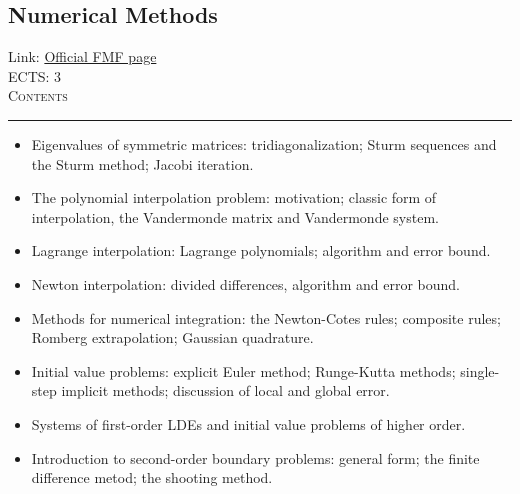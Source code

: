 \documentclass[11pt, a4paper]{article}
\newenvironment{course}[3]{
\subsection{#1}%
Link: \href{#2}{Official FMF page}\\%
ECTS: #3%
\vspace{1ex}
\\
{\large \textsc{Contents}}\\[-0.9ex]%
\rule{\textwidth}{0.5pt}
\vspace{-3ex}
}
{}
\newenvironment{chapter}[1]{
\begin{tcolorbox}[title=#1, breakable]
}
{\end{tcolorbox}}
\begin{document}
\begin{course}{Numerical Methods}{https://www.fmf.uni-lj.si/en/study-physics/programmes/1fiz/2020/7000777/courses/524/}{3}
\begin{chapter}{The eigenvalue problem}
\begin{itemize}
            \item Eigenvalues of symmetric matrices: tridiagonalization; Sturm sequences and the Sturm method; Jacobi iteration.
        
        \end{itemize}
    \end{chapter}

    \begin{chapter}{Polynomial interpolation}
        \begin{itemize}
        
            \item The polynomial interpolation problem: motivation; classic form of interpolation, the Vandermonde matrix and Vandermonde system.

            \item Lagrange interpolation: Lagrange polynomials; algorithm and error bound.

            \item Newton interpolation: divided differences, algorithm and error bound.
        
        \end{itemize}
    \end{chapter}

    \begin{chapter}{Numerical methods for ODEs}
        \begin{itemize}
        
            \item Methods for numerical integration: the Newton-Cotes rules; composite rules; Romberg extrapolation; Gaussian quadrature.

            \item Initial value problems: explicit Euler method; Runge-Kutta methods; single-step implicit methods; discussion of local and global error.

            \item Systems of first-order LDEs and initial value problems of higher order.

            \item Introduction to second-order boundary problems: general form; the finite difference metod; the shooting method.
        
        \end{itemize}
    \end{chapter}

\end{course}
\end{document}
